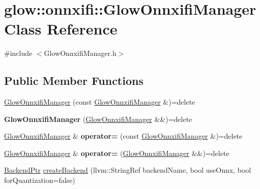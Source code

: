 \hypertarget{classglow_1_1onnxifi_1_1_glow_onnxifi_manager}{}\section{glow\+:\+:onnxifi\+:\+:Glow\+Onnxifi\+Manager Class Reference}
\label{classglow_1_1onnxifi_1_1_glow_onnxifi_manager}


{\ttfamily \#include $<$Glow\+Onnxifi\+Manager.\+h$>$}

\subsection*{Public Member Functions}
\begin{DoxyCompactItemize}
\item 
\hyperlink{classglow_1_1onnxifi_1_1_glow_onnxifi_manager_a7d0eee5569b3f09ab0c26d551a5d069d}{Glow\+Onnxifi\+Manager} (const \hyperlink{classglow_1_1onnxifi_1_1_glow_onnxifi_manager}{Glow\+Onnxifi\+Manager} \&)=delete
\item 
\mbox{\label{classglow_1_1onnxifi_1_1_glow_onnxifi_manager_ab3b625b8abc439587b4443952a2fc171}} 
{\bfseries Glow\+Onnxifi\+Manager} (\hyperlink{classglow_1_1onnxifi_1_1_glow_onnxifi_manager}{Glow\+Onnxifi\+Manager} \&\&)=delete
\item 
\mbox{\label{classglow_1_1onnxifi_1_1_glow_onnxifi_manager_abb294faa1457ef93ac82b0ef91ea685c}} 
\hyperlink{classglow_1_1onnxifi_1_1_glow_onnxifi_manager}{Glow\+Onnxifi\+Manager} \& {\bfseries operator=} (const \hyperlink{classglow_1_1onnxifi_1_1_glow_onnxifi_manager}{Glow\+Onnxifi\+Manager} \&)=delete
\item 
\mbox{\label{classglow_1_1onnxifi_1_1_glow_onnxifi_manager_aa7f03bd9ef142c36930cd74dad1cacc3}} 
\hyperlink{classglow_1_1onnxifi_1_1_glow_onnxifi_manager}{Glow\+Onnxifi\+Manager} \& {\bfseries operator=} (\hyperlink{classglow_1_1onnxifi_1_1_glow_onnxifi_manager}{Glow\+Onnxifi\+Manager} \&\&)=delete
\item 
\hyperlink{classglow_1_1onnxifi_1_1_backend}{Backend\+Ptr} \hyperlink{classglow_1_1onnxifi_1_1_glow_onnxifi_manager_ad637fc5474d8a157aee9b44c0533e3a1}{create\+Backend} (llvm\+::\+String\+Ref backend\+Name, bool use\+Onnx, bool for\+Quantization=false)

\end{DoxyCompactItemize}
